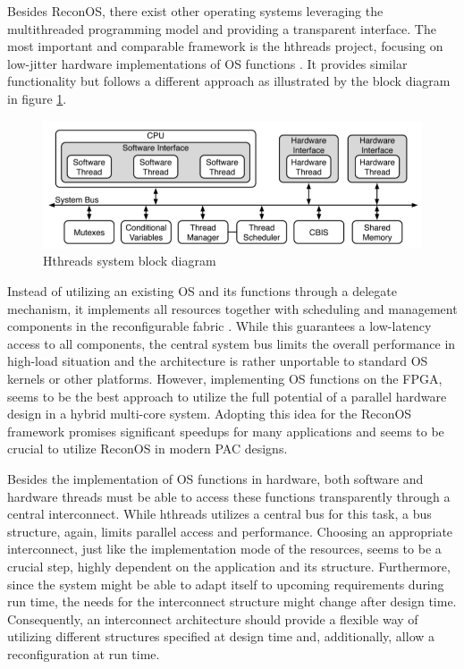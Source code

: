 Besides ReconOS, there exist other operating systems leveraging the
multithreaded programming model and providing a transparent interface. The
most important and comparable framework is the hthreads project, focusing on
low-jitter hardware implementations of \ac{OS} functions \citep{AHK14}. It
provides similar functionality but follows a different approach as illustrated
by the block diagram in figure \ref{fig:hthreads}.
\begin{figure}[tb]
	\centering
	\includegraphics[width=12cm]{../figures/hthreads}
	\caption{Hthreads system block diagram \citep{ASA08}}
	\label{fig:hthreads}
\end{figure}
Instead of utilizing an existing \ac{OS} and its functions through a delegate
mechanism, it implements all resources together with scheduling and management
components in the reconfigurable fabric \citep{ASA08}. While this guarantees a
low-latency access to all components, the central system bus limits the
overall performance in high-load situation and the architecture is rather
unportable to standard \ac{OS} kernels or other platforms. However,
implementing  \ac{OS} functions on the \ac{FPGA}, seems to be the best
approach to utilize the full potential of a parallel hardware design in a
hybrid multi-core system. Adopting this idea for the ReconOS framework
promises significant speedups for many applications and seems to be crucial to
utilize ReconOS in modern \ac{PAC} designs.

Besides the implementation of \ac{OS} functions in hardware, both software and
hardware threads must be able to access these functions transparently through
a central interconnect. While hthreads utilizes a central bus for this task, a
bus structure, again, limits parallel access and performance. Choosing an
appropriate interconnect, just like the implementation mode of the resources,
seems to be a crucial step, highly dependent on the application and its
structure. Furthermore, since the system might be able to adapt itself to
upcoming requirements during run time, the needs for the interconnect
structure might change after design time. Consequently, an interconnect
architecture should provide a flexible way of utilizing different structures
specified at design time and, additionally, allow a reconfiguration at run
time.

